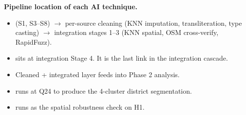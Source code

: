 \begin{callout}
\textbf{\color{plotblue}Pipeline location of each AI technique.}\quad
\begin{itemize}
 \item {} (S1, S3--S8) $\to$
 per-source cleaning (KNN imputation, 
 transliteration, type casting) $\to$
 integration stages 1--3 (KNN spatial, OSM cross-verify,
 RapidFuzz).
 \item {} sits at integration Stage 4. It is the last
 link in the integration cascade.
 \item Cleaned + integrated layer feeds into Phase 2 analysis.
 \item {} runs at Q24 to produce the 4-cluster
 district segmentation.
 \item {} runs as the spatial robustness check on
 H1.
\end{itemize}
\end{callout}
